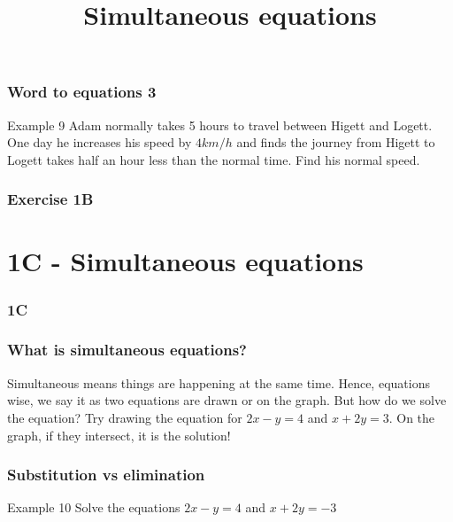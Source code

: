 \documentclass{beamer}
\begin{document}
\begin{frame}[t]
    \frametitle{Word to equations 3}
    \begin{block}{Example 9}
        Adam normally takes 5 hours to travel between Higett and Logett. One day he increases
 his speed by $4 km/h$ and finds the journey from Higett to Logett takes half an hour less
 than the normal time. Find his normal speed.
    \end{block}
\end{frame}

\begin{frame}
    \frametitle{Exercise 1B}
\end{frame}


\section{1C - Simultaneous equations}
\begin{frame}
    \frametitle{1C}
    \begin{center}
        \title{Simultaneous equations}
        \maketitle
    \end{center}
\end{frame}

\begin{frame}[t]
    \frametitle{What is simultaneous equations?}
    Simultaneous means things are happening at the same time. Hence, equations wise, we say it as two equations are 
    drawn or on the graph. But how do we solve the equation? Try drawing the equation for $2x-y=4$ and $x + 2y = 3$. 
    On the graph, if they intersect, it is the solution!
\end{frame}

\begin{frame}[t]
    \frametitle{Substitution vs elimination}
    \begin{block}{Example 10}
        Solve the equations $2x - y = 4$ and $x + 2y = -3$
    \end{block}
\end{frame}
\end{document}
